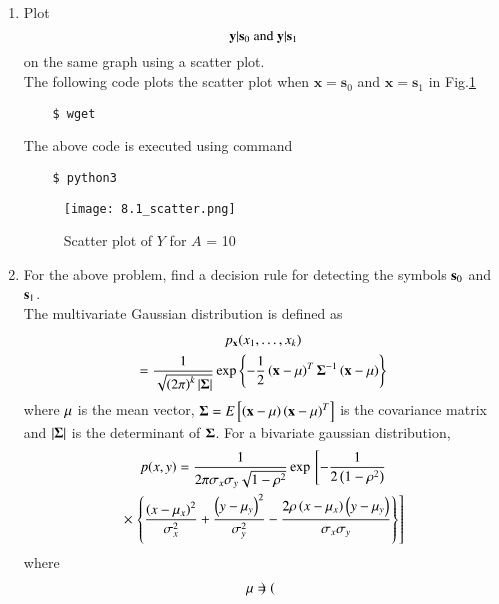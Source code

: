 \documentclass[journal,12pt,twocolumn]{IEEEtran}
\renewcommand\thesection{\arabic{section}}
\begin{document}
\begin{enumerate}[label=\thesection.\arabic*
,ref=\thesection.\theenumi]
\item
\label{ch5_fsk}
Plot 
%
\begin{equation}
\mathbf{y}|\mathbf{s}_0 \text{ and } \mathbf{y}|\mathbf{s}_1
\end{equation}
%
on the same graph using a scatter plot.\\
%
\solution The following code plots the scatter plot when 
$\textbf{x} = \textbf{s}_0$ and $\textbf{x} = \textbf{s}_1$ in Fig.\ref{fig:8.1_scatter}
\begin{lstlisting}
    $ wget
    \end{lstlisting}
    The above code is executed using command
    \begin{lstlisting}
    $ python3 
    \end{lstlisting}
    \begin{figure}[h]
        \centering
        \texttt{[image: 8.1\_scatter.png]}
        \caption{Scatter plot of $Y$ for $A$ = 10}
        \label{fig:8.1_scatter}
    \end{figure}
\item
For the above problem, find a decision rule for detecting the symbols $\mathbf{s}_0 $ and $\mathbf{s}_1$.\\
%
\solution The multivariate Gaussian distribution is defined as
%
\begin{multline}
\label{eq:multivariate}
p_{\mathbf{x}}(x_1,\dots,x_k)
\\
=\frac{1}{\sqrt{\left(2\pi\right)^k\left\vert\mathbf{\Sigma}\right\vert}}\exp\left\{-\frac{1}{2}\left(\mathbf{x}-\mathbf{\mu}\right)^T\mathbf{\Sigma}^{-1}\left(\mathbf{x}-\mathbf{\mu}\right)\right\}
\end{multline}
%
where $\mathbf{\mu}$ is the mean vector, $\mathbf{\Sigma} = E{}\left[\left(\mathbf{x}-\mathbf{\mu}\right)\left(\mathbf{x}-\mathbf{\mu}\right)^T\right]$ is the covariance matrix and $\left\vert\mathbf{\Sigma}\right\vert$ is the determinant of $\mathbf{\Sigma}$.
For a bivariate gaussian distribution,
{\small
\begin{multline}
\label{eq:bivariate}
p(x,y)= \frac{1}{2\pi \sigma_x\sigma_y\sqrt{1-\rho^2}}\exp{}\left[-\frac{1}{2\left(1-\rho^2\right)}\right.
\\
\times {}\left.\left\{\frac{\left(x-\mu_x\right)^2}{\sigma_x^2}+\frac{\left(y-\mu_y\right)^2}{\sigma_y^2}-\frac{2\rho\left(x-\mu_x\right)\left(y-\mu_y\right)}{\sigma_x\sigma_y}\right\}\right]
\end{multline}
}
%
where
%
\begin{align}
&\mbf{\mu}=
\begin{pmatrix*}

\end{pmatrix*}
\end{align}
\end{enumerate}
\end{document}
